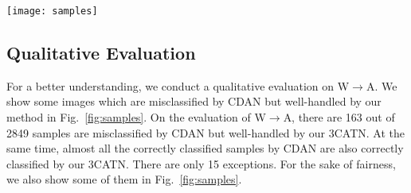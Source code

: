 \documentclass[sigconf]{acmart}
\begin{document}
\begin{figure*}[t!h]
\begin{center}
\end{center}
\vspace{-16pt}
\caption{Parameter sensitivity (a-c) and training stability (d). The parameters in our model are tuned by importance weighted cross validation~\cite{sugiyama2007covariate}. W$\rightarrow$A and A$\rightarrow$W on Office-31 dataset are evaluated as examples. }
\label{fig:para}
\vspace{-5pt}
\end{figure*}

\begin{figure*}[t!h]
\begin{center}
\texttt{[image: samples]}
\end{center}
\vspace{-10pt}
\caption{Qualitative results on W$\rightarrow$A. Blue label is the ground-truth and gray label is the prediction. This figure mainly shows some randomly selected samples which are wrongly predicted by CDAN but correctly classified by our 3CATN. Although almost all of the samples which are correctly predicted by CDAN are also correctly handled by our method, we show several exceptions within the dash lines for the sake of fairness.}
\label{fig:samples}
\vspace{-5pt}
\end{figure*}


\subsection{Qualitative Evaluation}
For a better understanding, we conduct a qualitative evaluation on W$\rightarrow$A. We show some images which are misclassified by CDAN but well-handled by our method in Fig.~\ref{fig:samples}. On the evaluation of W$\rightarrow$A, there are 163 out of 2849 samples are misclassified by CDAN but well-handled by our 3CATN. At the same time, almost all the correctly classified samples by CDAN are also correctly classified by our 3CATN. There are only 15 exceptions. For the sake of fairness, we also show some of them in Fig.~\ref{fig:samples}.
\end{document}
